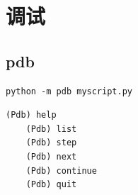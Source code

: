 \chapter{调试}
\label{cha:python调试}

\section{pdb}
\label{sec:pdb}
\begin{lstlisting}[style=demostyle,numbers=none]
    python -m pdb myscript.py
\end{lstlisting}
\begin{lstlisting}[style=demostyle,numbers=none]
    (Pdb) help
    (Pdb) list
    (Pdb) step
    (Pdb) next
    (Pdb) continue
    (Pdb) quit
\end{lstlisting}
